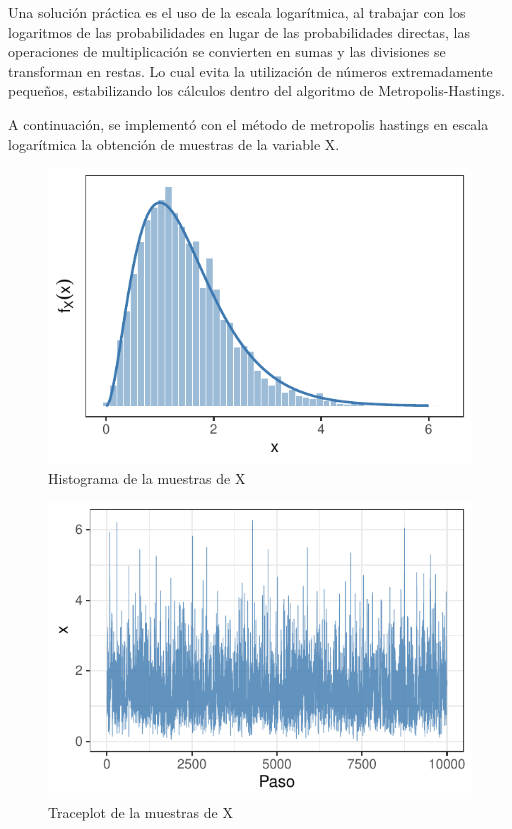 \documentclass[
]{article}
\begin{document}
Una solución práctica es el uso de la escala logarítmica, al trabajar con los logaritmos de las probabilidades en lugar de las probabilidades directas, las operaciones de multiplicación se convierten en sumas y las divisiones se transforman en restas. Lo cual evita la utilización de números extremadamente pequeños, estabilizando los cálculos dentro del algoritmo de Metropolis-Hastings.

\newpage

A continuación, se implementó con el método de metropolis hastings en escala logarítmica la obtención de muestras de la variable X.

\begin{figure}

{\centering \includegraphics{TP-2---El-Dibu-de-la-vida_files/figure-latex/f9-1} 

}

\caption{Histograma de la muestras de X}\label{fig:f9}
\end{figure}

\begin{figure}

{\centering \includegraphics{TP-2---El-Dibu-de-la-vida_files/figure-latex/f10-1} 

}

\caption{Traceplot de la muestras de X}\label{fig:f10}
\end{figure}
\end{document}
